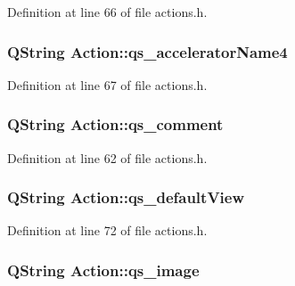 Definition at line 66 of file actions.h.

\hypertarget{classAction_a7284950e9b48ead289b5ccce09fcd10c}{
\subsubsection[{qs\_\-acceleratorName4}]{\setlength{\rightskip}{0pt plus 5cm}QString {\bf Action::qs\_\-acceleratorName4}}}
\label{classAction_a7284950e9b48ead289b5ccce09fcd10c}


Definition at line 67 of file actions.h.

\hypertarget{classAction_ab64fc5a6e59778ef85350d47d9cb6ce0}{
\subsubsection[{qs\_\-comment}]{\setlength{\rightskip}{0pt plus 5cm}QString {\bf Action::qs\_\-comment}}}
\label{classAction_ab64fc5a6e59778ef85350d47d9cb6ce0}


Definition at line 62 of file actions.h.

\hypertarget{classAction_a95faeba966aec50a7fb869fad2b11e52}{
\subsubsection[{qs\_\-defaultView}]{\setlength{\rightskip}{0pt plus 5cm}QString {\bf Action::qs\_\-defaultView}}}
\label{classAction_a95faeba966aec50a7fb869fad2b11e52}


Definition at line 72 of file actions.h.

\hypertarget{classAction_ae949229a3406a96b59c832acfef35009}{
\subsubsection[{qs\_\-image}]{\setlength{\rightskip}{0pt plus 5cm}QString {\bf Action::qs\_\-image}}}
\label{classAction_ae949229a3406a96b59c832acfef35009}


